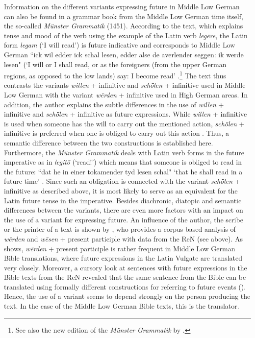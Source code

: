 \documentclass[output=paper,colorlinks,citecolor=brown]{langscibook}
\begin{document}
Information on the different variants expressing future in Middle Low German can also be found in a grammar book from the Middle Low German time itself, the so-called \textit{Münster Grammatik} (1451). According to the text, which explains tense and mood of the verb using the example of the Latin verb \textit{legēre}, the Latin form \textit{legam} (`I will read') is future indicative and corresponds to Middle Low German ``ick wil edder ick schal lesen, edder alse de averlender seggen: ik werde lesen" (`I will or I shall read, or as the foreigners (from the upper German regions, as opposed to the low lands) say: I become read' \citep[44]{Wilken1877}.\footnote{See also the new edition of the \textit{Münster Grammatik} by \citet[61--63]{Caparrini2018}.} The text thus contrasts the variants \textit{willen} + infinitive and \textit{schȫlen} + infinitive used in Middle Low German with the variant \textit{wērden} + infinitive used in High German areas. In addition, the author explains the subtle differences in the use of \textit{willen} + infinitive and \textit{schȫlen} + infinitive as future expressions. While \textit{willen} + infinitive is used when someone has the will to carry out the mentioned action, \textit{schȫlen} + infinitive is preferred when one is obliged to carry out this action \citep[44]{Wilken1877}. Thus, a semantic difference between the two constructions is established here. Furthermore, the \textit{Münster Grammatik} deals with Latin verb forms in the future imperative as in \textit{legitō} (`read!') which means that someone is obliged to read in the future: ``dat he in einer tokamender tyd lesen schal" `that he shall read in a future time' \citep[45]{Wilken1877}. Since such an obligation is connected with the variant \textit{schȫlen} + infinitive as described above, it is most likely to serve as an equivalent for the Latin future tense in the imperative.
Besides diachronic, diatopic and semantic differences between the variants, there are even more factors with an impact on the use of a variant for expressing future. An influence of the author, the scribe or the printer of a text is shown by \citet[440]{Ihden2023}, who provides a corpus-based analysis of \textit{wērden} and \textit{wēsen} + present participle with data from the ReN (see above). As \citet[440]{Ihden2023} shows, \textit{wērden} + present participle is rather frequent in Middle Low German Bible translations, where future expressions in the Latin Vulgate are translated very closely. Moreover, a cursory look at sentences with future expressions in the Bible texts from the ReN revealed that the same sentence from the Bible can be translated using formally different constructions for referring to future events (\cite[436]{Ihden2023}). Hence, the use of a variant seems to depend strongly on the person producing the text. In the case of the Middle Low German Bible texts, this is the translator.
\end{document}
